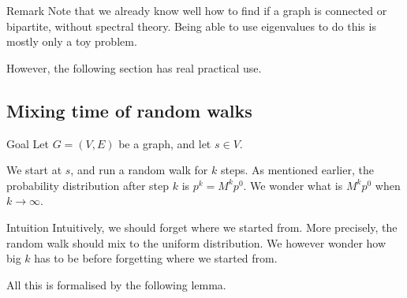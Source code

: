 \documentclass[a4paper]{article}
\begin{document}
\begin{parag}{Remark}
    Note that we already know well how to find if a graph is connected or bipartite, without spectral theory. Being able to use eigenvalues to do this is mostly only a toy problem.

    However, the following section has real practical use.
\end{parag}

\subsection{Mixing time of random walks}

\begin{parag}{Goal}
    Let $G = \left(V, E\right)$ be a graph, and let $s \in V$.

    We start at $s$, and run a random walk for $k$ steps. As mentioned earlier, the probability distribution after step $k$ is $p^k = M^k p^0$. We wonder what is $M^k p^0$ when $k \to \infty$.

    \begin{subparag}{Intuition}
        Intuitively, we should forget where we started from. More precisely, the random walk should mix to the uniform distribution. We however wonder how big $k$ has to be before forgetting where we started from.

        All this is formalised by the following lemma.
    \end{subparag}
\end{parag}
\end{document}
